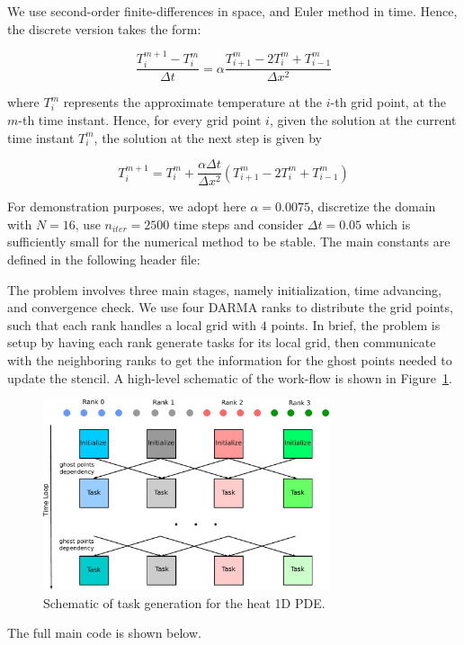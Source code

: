 We use second-order finite-differences in space, and Euler method in time. 
Hence, the discrete version takes the form: 
\begin{large}
\begin{equation}
\frac{T_i^{m+1} - T_i^m}{\Delta t} 
= \alpha \frac{T_{i+1}^m - 2T_i^m + T_{i-1}^m}{\Delta x^2}
\end{equation}
\end{large}
where $T_i^m$ represents the approximate temperature at the $i$-th grid point, 
at the $m$-th time instant. Hence, for every grid point $i$, given the solution 
at the current time instant $T_i^m$, the solution at the next step is given by 
\begin{large}
\begin{equation}
T_i^{m+1} = T_i^m + \frac{ \alpha \Delta t }{\Delta x^2} 
(T_{i+1}^m - 2T_i^m + T_{i-1}^m)
\end{equation}
\end{large}

For demonstration purposes, we adopt here $\alpha=0.0075$, discretize the domain 
with $N=16$, use $n_{iter}=2500$ time steps and consider $\Delta t=0.05$ which is 
sufficiently small for the numerical method to be stable.
The main constants are defined in the following header file:


The problem involves three main stages, namely initialization, time advancing, 
and convergence check. We use four DARMA ranks to distribute the grid points, 
such that each rank handles a local grid with $4$ points. 
In brief, the problem is setup by having each rank 
generate tasks for its local grid, then communicate with the neighboring ranks 
to get the information for the ghost points needed to update the stencil. 
A high-level schematic of the work-flow is shown in Figure~\ref{fig:example_heat1d}.

\begin{figure}[!ht]
\centering
\includegraphics[width=0.75\textwidth]{./figures/examples/heat_tasks.pdf}
\caption{Schematic of task generation for the heat 1D PDE.}
\label{fig:example_heat1d}
\end{figure}


The full main code is shown below.






